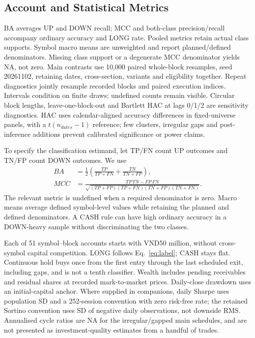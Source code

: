 \subsection{Account and Statistical Metrics}
BA averages UP and DOWN recall; MCC and both-class precision/recall accompany ordinary accuracy and LONG rate. Pooled metrics retain actual class supports. Symbol macro means are unweighted and report planned/defined denominators. Missing class support or a degenerate MCC denominator yields NA, not zero. Main contrasts use 10,000 paired whole-block resamples, seed 20261102, retaining dates, cross-section, variants and eligibility together. Repeat diagnostics jointly resample recorded blocks and paired execution indices. Intervals condition on finite draws; undefined counts remain visible. Circular block lengths, leave-one-block-out and Bartlett HAC at lags 0/1/2 are sensitivity diagnostics. HAC uses calendar-aligned accuracy differences in fixed-universe panels, with a $t(n_{dates}-1)$ reference; few clusters, irregular gaps and post-inference additions prevent calibrated significance or power claims.

To specify the classification estimand, let TP/FN count UP outcomes and TN/FP count DOWN outcomes. We use
\begin{equation}
 \begin{aligned}
 BA&=\frac12\left(\frac{TP}{TP+FN}+\frac{TN}{TN+FP}\right),\\
 MCC&=\frac{TP\,TN-FP\,FN}{\sqrt{(TP+FP)(TP+FN)(TN+FP)(TN+FN)}}.
 \end{aligned}
 \label{eq:classification_metrics}
\end{equation}
The relevant metric is undefined when a required denominator is zero. Macro means average defined symbol-level values while retaining the planned and defined denominators. A CASH rule can have high ordinary accuracy in a DOWN-heavy sample without discriminating the two classes.

Each of 51 symbol--block accounts starts with VND50 million, without cross-symbol capital competition. LONG follows Eq.~\ref{eq:label}; CASH stays flat. Continuous hold buys once from the first entry through the last scheduled exit, including gaps, and is not a tenth classifier. Wealth includes pending receivables and residual shares at recorded mark-to-market prices. Daily-close drawdown uses an initial-capital anchor. Where supplied in companions, daily Sharpe uses population SD and a 252-session convention with zero risk-free rate; the retained Sortino convention uses SD of negative daily observations, not downside RMS. Annualised cycle ratios are NA for the irregular/gapped main schedules, and are not presented as investment-quality estimates from a handful of trades.

